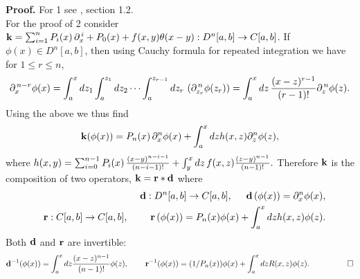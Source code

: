 \documentclass[10pt]{article}
\newcommand{\be}{\begin{equation}}
\newcommand{\ee}{\end{equation}}
\newcommand{\bea}{\begin{eqnarray}}
\newcommand{\eea}{\end{eqnarray}}
\newcommand{\nn}{\nonumber}
\newcommand{\rd}{\partial}
\begin{document}
{{{\bf Proof.} For 1 see \cite{it}, section 1.2. \\
For the proof of 2 consider ${\bf{k}}=\sum^{n}_{i=1} P_{i}(x)
\,\rd_{x}^{\,i}+P_{0}(x)+
f(x,y)\theta(x-y):{D}^{n}[a,b]\to{C}[a,b]$. If
$\phi(x)\in{D}^{n}[a,b]$, then using Cauchy formula for repeated
integration we have for $1 \le r\le n$,
\be\rd^{\,n-r}_{x}\phi(x)=\int^{x}_{a}dz_1\int^{z_1}_{a}dz_2\cdots\int^{z_{r-1}}_{a}dz_{r}\,\,(\rd^{\,n}_{z_{r}}\phi(z_r))=\int^{x}_{a}dz\,
{(x-z)^{r-1}\over (r-1)!}\rd^{\,n}_{z}\phi(z).\nn\ee Using the above
we thus find \be {\bf{k}}(\phi(x))= P_{n}(x)\,\rd^{n}_{x}\phi(x)+
\int^{x}_{a} dz h(x,z)\rd^{n}_{z}\phi(z), \nn\ee
 where $h(x,y)=\sum^{n-1}_{i=0} {P_{i}(x)}
\,{(x-y)^{n-i-1}\over {(n-i-1)!}}+ \int^{x}_{y}
dz\,{f(x,z)}{(z-y)^{n-1}\over {(n-1)!}}.$
Therefore $\bf{k}$ is the composition of two operators,
$\bf{k}=\bf{r}*\bf{d}$ where \bea  &&{\bf{d}}:{D}^{n}[a,b] \to
C[a,b], \hspace{0.5cm} {\bf{d}}\,(\phi(x))=\rd^{n}_{x}\phi(x),\nn\\
&&{\bf{r}}:{C}[a,b] \to C[a,b], \hspace{0.8cm}
{\bf{r}}\,(\phi(x))=P_{n}(x)\phi(x)+\int^{x}_{a}dz h(x,z)\phi(z).
\nn\eea Both $\bf{d}$ and $\bf{r}$ are invertible:
\be{\bf{d}}^{-1}(\phi(x))=\int^{x}_{a} dz
{(x-z)^{n-1}\over(n-1)!}\phi(z),\hspace{0.75cm}
{\bf{r}}^{-1}(\phi(x))={(1/P_{n}(x))\phi(x)}+\int^{x}_{a} dz
R(x,z)\phi(z).\nn\hspace{1cm}\qed\ee\\

}}
\end{document}
